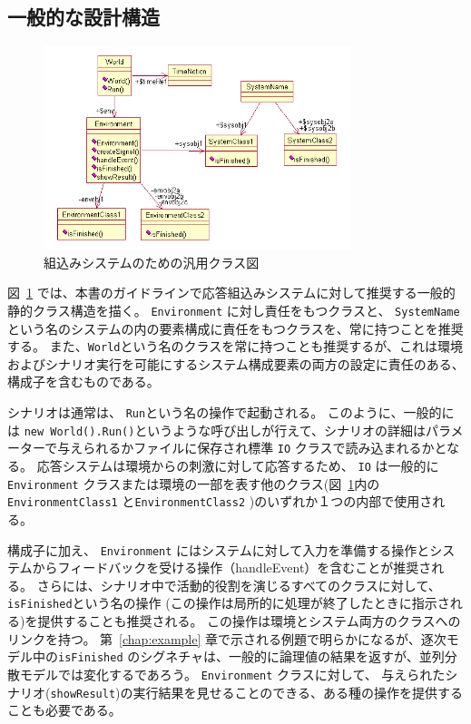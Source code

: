 \documentclass[\pformat,12pt]{jreport}
\begin{document}
\subsection{一般的な設計構造}\label{sec:typicalclassdiag}

\begin{figure}
\begin{center}
\includegraphics[width=0.8\textwidth]{generalclassdiag}
\end{center}
\caption{組込みシステムのための汎用クラス図}\label{fig:classdiag}
\end{figure}

図~\ref{fig:classdiag} では、本書のガイドラインで応答組込みシステムに対して推奨する一般的静的クラス構造を描く。
\texttt{Environment} に対し責任をもつクラスと、 \texttt{SystemName}という名のシステムの内の要素構成に責任をもつクラスを、常に持つことを推奨する。
また、\texttt{World}という名のクラスを常に持つことも推奨するが、これは環境およびシナリオ実行を可能にするシステム構成要素の両方の設定に責任のある、構成子を含むものである。

シナリオは通常は、 \texttt{Run}という名の操作で起動される。
このように、一般的には \texttt{new World().Run()}というような呼び出しが行えて、シナリオの詳細はパラメーターで与えられるかファイルに保存され標準 \texttt{IO} クラスで読み込まれるかとなる。
応答システムは環境からの刺激に対して応答するため、 \texttt{IO} は一般的に \texttt{Environment} クラスまたは環境の一部を表す他のクラス(図~\ref{fig:classdiag}内の\texttt{EnvironmentClass1} と\texttt{EnvironmentClass2} )のいずれか１つの内部で使用される。

構成子に加え、 \texttt{Environment} にはシステムに対して入力を準備する操作とシステムからフィードバックを受ける操作（handleEvent）を含むことが推奨される。
さらには、シナリオ中で活動的役割を演じるすべてのクラスに対して、 \texttt{isFinished}という名の操作 (この操作は局所的に処理が終了したときに指示される)を提供することも推奨される。
この操作は環境とシステム両方のクラスへのリンクを持つ。
第~\ref{chap:example} 章で示される例題で明らかになるが、逐次モデル中の\texttt{isFinished} のシグネチャは、一般的に論理値の結果を返すが、並列分散モデルでは変化するであろう。
 \texttt{Environment} クラスに対して、
 与えられたシナリオ(\texttt{showResult})の実行結果を見せることのできる、ある種の操作を提供することも必要である。
\end{document}
